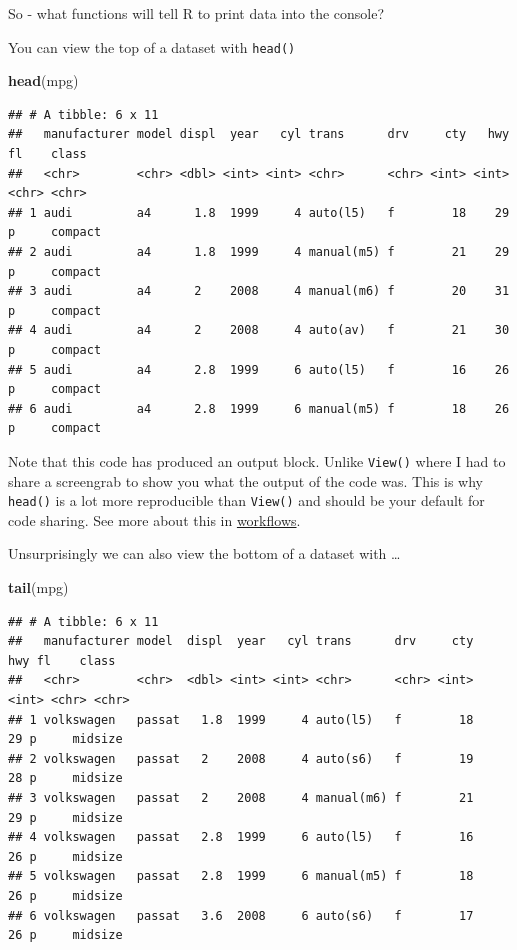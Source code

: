 \documentclass[
]{book}
\newenvironment{Shaded}{\begin{snugshade}}{\end{snugshade}}
\newcommand{\KeywordTok}[1]{\textcolor[rgb]{0.13,0.29,0.53}{\textbf{#1}}}
\newcommand{\NormalTok}[1]{#1}
\begin{document}
So - what functions will tell R to print data into the console?

You can view the top of a dataset with \texttt{head()}

\begin{Shaded}
\begin{Highlighting}[]
 \KeywordTok{head}\NormalTok{(mpg)}
\end{Highlighting}
\end{Shaded}

\begin{verbatim}
## # A tibble: 6 x 11
##   manufacturer model displ  year   cyl trans      drv     cty   hwy fl    class  
##   <chr>        <chr> <dbl> <int> <int> <chr>      <chr> <int> <int> <chr> <chr>  
## 1 audi         a4      1.8  1999     4 auto(l5)   f        18    29 p     compact
## 2 audi         a4      1.8  1999     4 manual(m5) f        21    29 p     compact
## 3 audi         a4      2    2008     4 manual(m6) f        20    31 p     compact
## 4 audi         a4      2    2008     4 auto(av)   f        21    30 p     compact
## 5 audi         a4      2.8  1999     6 auto(l5)   f        16    26 p     compact
## 6 audi         a4      2.8  1999     6 manual(m5) f        18    26 p     compact
\end{verbatim}

Note that this code has produced an output block. Unlike \texttt{View()} where I had to share a screengrab to show you what the output of the code was. This is why \texttt{head()} is a lot more reproducible than \texttt{View()} and should be your default for code sharing. See more about this in \protect\hyperlink{workflows}{workflows}.

Unsurprisingly we can also view the bottom of a dataset with \ldots{}

\begin{Shaded}
\begin{Highlighting}[]
\KeywordTok{tail}\NormalTok{(mpg)}
\end{Highlighting}
\end{Shaded}

\begin{verbatim}
## # A tibble: 6 x 11
##   manufacturer model  displ  year   cyl trans      drv     cty   hwy fl    class  
##   <chr>        <chr>  <dbl> <int> <int> <chr>      <chr> <int> <int> <chr> <chr>  
## 1 volkswagen   passat   1.8  1999     4 auto(l5)   f        18    29 p     midsize
## 2 volkswagen   passat   2    2008     4 auto(s6)   f        19    28 p     midsize
## 3 volkswagen   passat   2    2008     4 manual(m6) f        21    29 p     midsize
## 4 volkswagen   passat   2.8  1999     6 auto(l5)   f        16    26 p     midsize
## 5 volkswagen   passat   2.8  1999     6 manual(m5) f        18    26 p     midsize
## 6 volkswagen   passat   3.6  2008     6 auto(s6)   f        17    26 p     midsize
\end{verbatim}
\end{document}
